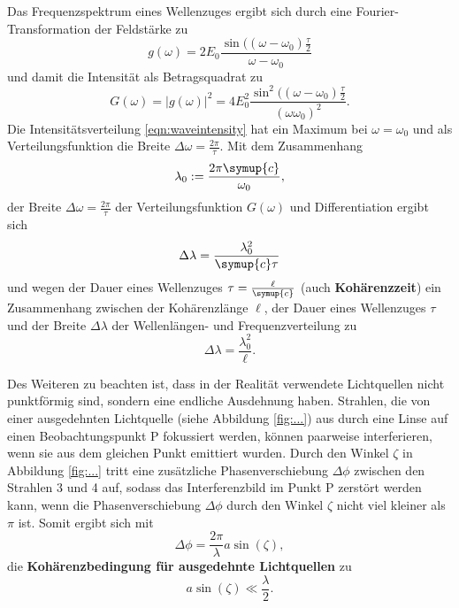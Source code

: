 Das Frequenzspektrum eines Wellenzuges ergibt sich durch eine Fourier-Transformation der
Feldstärke zu
\begin{equation}
	g(\omega) = 2E_0 \frac{\sin((\omega-\omega_0)\frac{\tau}{2}}{\omega-\omega_0}
\end{equation}
und damit die Intensität als Betragsquadrat zu
\begin{equation}
	\label{eqn:waveintensity}
	G(\omega) = |g(\omega)|^2 = 4E_0^2 \frac{\sin^2((\omega-\omega_0)\frac{\tau}{2}}{(\omega \omega_0)^2} \mathrm{.}
\end{equation}
Die Intensitätsverteilung \eqref{eqn:waveintensity} hat ein Maximum bei $\omega=\omega_0$ und
als Verteilungsfunktion die Breite $\Delta \omega = \frac{2\pi}{\tau}$.
Mit dem Zusammenhang
\begin{equation}
	\lambda_0 := \frac{2\pi \symup{c}}{\omega_0} \mathrm{,}
\end{equation}
der Breite $\Delta \omega = \frac{2\pi}{\tau}$ der Verteilungsfunktion $G(\omega)$ und
Differentiation ergibt sich
\begin{equation}
	\Delta \lambda = \frac{\lambda_0^2}{\symup{c}\tau}
\end{equation}
und wegen der Dauer eines Wellenzuges $\tau = \frac{\ell}{\symup{c}}$
(auch \textbf{Kohärenzzeit}) ein Zusammenhang zwischen der Kohärenzlänge $\ell$, der Dauer
eines Wellenzuges $\tau$ und der Breite $\Delta \lambda$ der Wellenlängen- und Frequenzverteilung zu
\begin{equation}
	\Delta \lambda = \frac{\lambda_0^2}{\ell} \mathrm{.}
\end{equation}

Des Weiteren zu beachten ist, dass in der Realität verwendete Lichtquellen nicht punktförmig
sind, sondern eine endliche Ausdehnung haben. Strahlen, die von einer ausgedehnten Lichtquelle
(siehe Abbildung \ref{fig:...}) aus durch eine Linse auf einen Beobachtungspunkt P fokussiert
werden, können paarweise interferieren, wenn sie aus dem gleichen Punkt emittiert wurden.
Durch den Winkel $\zeta$ in Abbildung \ref{fig:...} tritt eine zusätzliche Phasenverschiebung
$\Delta \phi$ zwischen den Strahlen 3 und 4 auf, sodass das Interferenzbild im Punkt P
zerstört werden kann, wenn die Phasenverschiebung $\Delta \phi$ durch den Winkel $\zeta$ nicht
viel kleiner als $\pi$ ist.
Somit ergibt sich mit
\begin{equation}
	\Delta \phi = \frac{2\pi}{\lambda} a \sin(\zeta) \mathrm{,}
\end{equation}
die \textbf{Kohärenzbedingung für ausgedehnte Lichtquellen} zu
\begin{equation}
	a \sin(\zeta) \ll \frac{\lambda}{2} \mathrm{.}
\end{equation}


